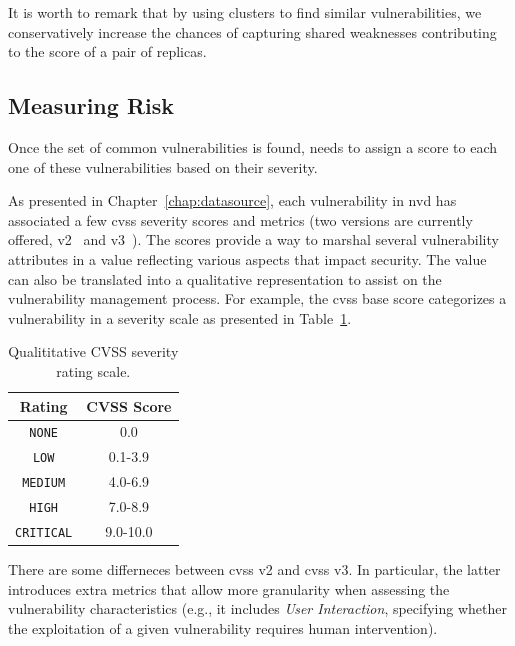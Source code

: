 It is worth to remark that by using clusters to find similar vulnerabilities, we conservatively increase the chances of capturing shared weaknesses contributing to the score of a pair of replicas.


\subsection{Measuring Risk}
\label{sec:measurerisk}


Once the set of common vulnerabilities is found, \system needs to assign a score to each one of these vulnerabilities based on their severity.

As presented in Chapter~\ref{chap:datasource}, each vulnerability in \gls{nvd} has associated a few \gls{cvss} severity scores and metrics (two versions are currently offered, v2~\cite{cvssv2} and v3~\cite{cvssv3}). 
The scores provide a way to marshal several vulnerability attributes in a value reflecting various aspects that impact security. 
The value can also be translated into a qualitative representation to assist on the vulnerability management process. 
For example, the \gls{cvss} base score categorizes a vulnerability in a severity scale as presented in Table~\ref{tab:cvss_scale}.


\begin{table}[h]
\begin{center}
\begin{tabular}{| c | c | }\hline
\textbf{Rating} & \textbf{CVSS Score} \\\hline\hline
\texttt{NONE} & 0.0 \\
\texttt{LOW} & 0.1-3.9 \\
\texttt{MEDIUM} & 4.0-6.9 \\
\texttt{HIGH} & 7.0-8.9 \\
\texttt{CRITICAL} & 9.0-10.0 \\ \hline
\end{tabular}
\caption{Qualititative CVSS severity rating scale.}
\label{tab:cvss_scale}
\end{center}
\end{table}

There are some differneces between \gls{cvss} v2 and \gls{cvss} v3.
In particular, the latter introduces extra metrics that allow more granularity when assessing the vulnerability characteristics (e.g., it includes \emph{User Interaction}, specifying whether the exploitation of a given vulnerability requires human intervention).


